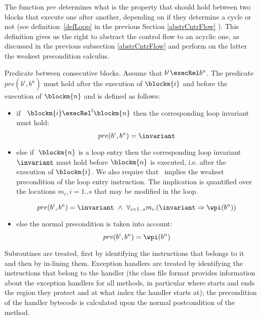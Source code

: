 The function  $pre$ determines what is the property that should hold between two blocks that execute one after another,
depending on if they determine a cycle or not (see definition~\ref{defLoop} in the previous Section \ref{abstrCntrFlow} ).  This definition
gives us the right to abstract the control flow to an acyclic one, as discussed in the previous subsection \ref{abstrCntrFlow} and perform on the latter the weakest precondition calculus.  
\begin{definition}
{Predicate between consecutive blocks.}\label{post2}
Assume that $b^i \execRel b^n$. The predicate $pre(b^{i}, b^{n})$ must hold after the execution of $\blockm{i}$ and before the execution of $\blockm{n}$ and is defined as follows:
\begin{itemize}
\item if \ $\blockm{i} \execRel^l \blockm{n}$ 
then the corresponding loop invariant must hold:
$$
pre(b^{i}, b^{n}) =  \invariant
$$

\item else if $\ \blockm{n}$ is a loop entry then the corresponding loop invariant $\invariant$ must hold before $\blockm{n}$ is executed, i.e. after the execution of $\blockm{i}$. We also require that \invariant \ implies the weakest precondition of the loop entry instruction. The implication is quantified over the locations $m_i , i= 1..s$ that may be modified in the loop.

$$
pre(b^{i}, b^{n}) = \invariant \ \wedge \ \forall_{i = 1..s} m_i.(
\invariant \Rightarrow \wpi(b^{n}))
$$
\item else the normal precondition is taken into account:
$$
pre(b^{i}, b^{n}) = \wpi(b^{n})
$$
\end{itemize}
\end{definition}

Subroutines are treated, first by identifying the instructions that belongs to it and then by in-lining them. Exception handlers are 
treated by identifying the instructions that belong to the handler (the class file format provides information about the exception handlers for all methods, in particular where starts and ends the region 
they protect and at what index the handler starts at); the precondition of the handler bytecode is calculated upon the normal postcondition of the method.


